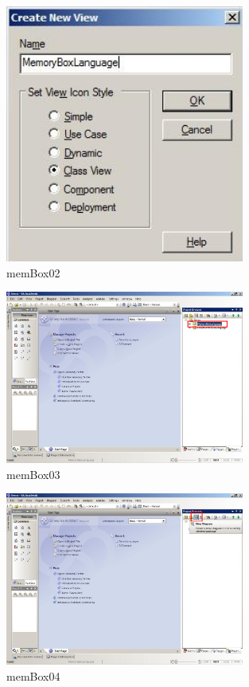 \begin{figure}[!h]
	\centering
  \includegraphics[width=0.7\textwidth]{pics/memBox02.png}
	\caption{memBox02}
	\label{memBox02}
\end{figure}

\begin{figure}[!h]
	\centering
  \includegraphics[width=0.7\textwidth]{pics/memBox03.png}
	\caption{memBox03}
	\label{memBox03}
\end{figure}

\begin{figure}[!h]
	\centering
  \includegraphics[width=0.7\textwidth]{pics/memBox04.png}
	\caption{memBox04}
	\label{memBox04}
\end{figure}

